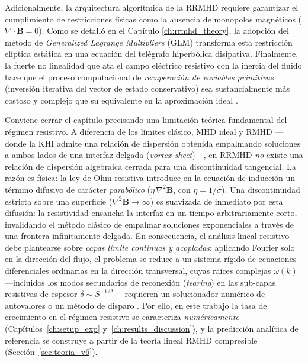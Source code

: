 Adicionalmente, la arquitectura algorítmica de la RRMHD requiere garantizar el cumplimiento de restricciones físicas como la ausencia de monopolos magnéticos ($\nabla \cdot \mathbf{B} = 0$). Como se detalló en el Capítulo \ref{ch:rrmhd_theory}, la adopción del método de \textit{Generalized Lagrange Multipliers} (GLM) transforma esta restricción elíptica estática en una ecuación del telégrafo hiperbólica disipativa. Finalmente, la fuerte no linealidad que ata el campo eléctrico resistivo con la inercia del fluido hace que el proceso computacional de \textit{recuperación de variables primitivas} (inversión iterativa del vector de estado conservativo) sea sustancialmente más costoso y complejo que su equivalente en la aproximación ideal \parencite{miranda-aranguren-2018}.

\primerparrafo Conviene cerrar el capítulo precisando una limitación teórica fundamental del régimen resistivo. A diferencia de los límites clásico, MHD ideal y RMHD ---donde la KHI admite una relación de dispersión obtenida empalmando soluciones a ambos lados de una interfaz delgada (\emph{vortex sheet})---, en RRMHD \emph{no} existe una relación de dispersión algebraica cerrada para una discontinuidad tangencial. La razón es física: la ley de Ohm resistiva introduce en la ecuación de inducción un término difusivo de carácter \emph{parabólico} ($\eta\,\nabla^2\mathbf{B}$, con $\eta=1/\sigma$). Una discontinuidad estricta sobre una superficie ($\nabla^2\mathbf{B}\to\infty$) es suavizada de inmediato por esta difusión: la resistividad ensancha la interfaz en un tiempo arbitrariamente corto, invalidando el método clásico de empalmar soluciones exponenciales a través de una frontera infinitamente delgada. En consecuencia, el análisis lineal resistivo debe plantearse sobre \emph{capas límite continuas y acopladas}: aplicando Fourier solo en la dirección del flujo, el problema se reduce a un sistema rígido de ecuaciones diferenciales ordinarias en la dirección transversal, cuyas raíces complejas $\omega(k)$ ---incluidos los modos secundarios de reconexión (\emph{tearing}) en las sub-capas resistivas de espesor $\delta\sim S^{-1/2}$--- requieren un solucionador numérico de autovalores o un método de disparo \parencite{furth1963, palenzuela-2009, lyubarsky2005}. Por ello, en este trabajo la tasa de crecimiento en el régimen resistivo se caracteriza \emph{numéricamente} (Capítulos~\ref{ch:setup_exp} y~\ref{ch:results_discussion}), y la predicción analítica de referencia se construye a partir de la teoría lineal RMHD compresible (Sección~\ref{sec:teoria_v6}).
